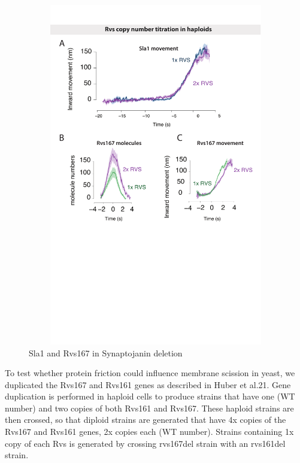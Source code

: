 				\begin{figure}
			\centering
			\includegraphics[width=15cm,height=15cm,keepaspectratio]{figures/results_final/rvs_haploid}
			\caption{Sla1 and Rvs167 in Synaptojanin deletion \label{fig5}}
		\end{figure}	
		

	To test whether protein friction could influence membrane scission in yeast, we duplicated the Rvs167 and Rvs161 genes as described in Huber et al.21. Gene duplication is performed in haploid cells to produce strains that have one (WT number) and two copies of both Rvs161 and Rvs167. These haploid strains are then crossed, so that diploid strains are generated that have 4x copies of the Rvs167 and Rvs161 genes, 2x copies each (WT number). Strains containing 1x copy of each Rvs is generated by crossing rvs167del strain with an rvs161del strain.
	


